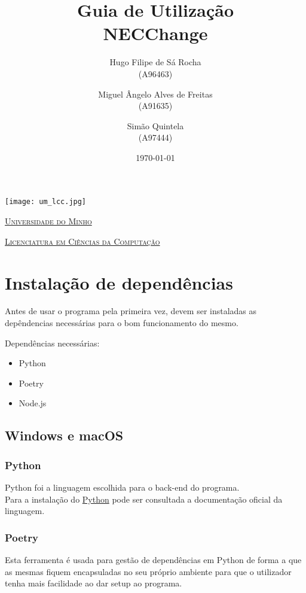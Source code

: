 \documentclass[11pt,a4paper]{report}
\title{Guia de Utilização\\
	\large NECChange}
\author{Hugo Filipe de Sá Rocha  \\ (A96463) \and Miguel Ângelo Alves de Freitas \\ (A91635)         \and Simão Quintela\\ (A97444)
       } %
\date{\today} %
\begin{document}
	\begin{minipage}{0.9\linewidth}
        \centering
		\texttt{[image: um\_lcc.jpg]}\par\vspace{1cm}
		\href{https://www.uminho.pt/PT}
		{\scshape\LARGE Universidade do Minho} \par
		\vspace{0.6cm}
		\href{https://lcc.di.uminho.pt}
		{\scshape\Large Licenciatura em Ciências da Computação} \par
		\maketitle
	\end{minipage}

	
	\tableofcontents
	
	\pagebreak
	
	\chapter{Instalação de dependências}
 Antes de usar o programa pela primeira vez, devem ser instaladas as depêndencias necessárias para o bom funcionamento do mesmo.  
 
 Dependências necessárias:  

 \begin{itemize}
     \item Python 
     \item Poetry
     \item Node.js
 \end{itemize}

 \section{Windows e macOS}
\subsection{Python}
Python foi a linguagem escolhida para o back-end do programa. \\

Para a instalação do \href{https://www.python.org/downloads/}{Python} pode ser consultada a documentação oficial da linguagem.
 
 \subsection{Poetry}
Esta ferramenta é usada para gestão de dependências em Python de forma a que as mesmas fiquem encapsuladas no seu próprio ambiente para que o utilizador tenha mais facilidade ao dar setup ao programa.  \\
\end{document}
